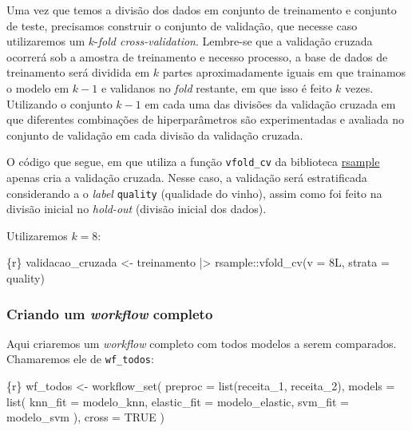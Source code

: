 \documentclass[
  letterpaper,
  DIV=11,
  numbers=noendperiod,
  oneside]{scrartcl}
\newenvironment{Shaded}{\begin{snugshade}}{\end{snugshade}}
\newcommand{\AttributeTok}[1]{\textcolor[rgb]{0.40,0.45,0.13}{#1}}
\newcommand{\ConstantTok}[1]{\textcolor[rgb]{0.56,0.35,0.01}{#1}}
\newcommand{\FunctionTok}[1]{\textcolor[rgb]{0.28,0.35,0.67}{#1}}
\newcommand{\InformationTok}[1]{\textcolor[rgb]{0.37,0.37,0.37}{#1}}
\newcommand{\NormalTok}[1]{\textcolor[rgb]{0.00,0.23,0.31}{#1}}
\newcommand{\OtherTok}[1]{\textcolor[rgb]{0.00,0.23,0.31}{#1}}
\newcommand{\SpecialCharTok}[1]{\textcolor[rgb]{0.37,0.37,0.37}{#1}}
\begin{document}
Uma vez que temos a divisão dos dados em conjunto de treinamento e
conjunto de teste, precisamos construir o conjunto de validação, que
necesse caso utilizaremos um \(k\)-\emph{fold cross-validation}.
Lembre-se que a validação cruzada ocorrerá sob a amostra de treinamento
e necesso processo, a base de dados de treinamento será dividida em
\(k\) partes aproximadamente iguais em que trainamos o modelo em \(k-1\)
e validanos no \emph{fold} restante, em que isso é feito \(k\) vezes.
Utilizando o conjunto \(k-1\) em cada uma das divisões da validação
cruzada em que diferentes combinações de hiperparâmetros são
experimentadas e avaliada no conjunto de validação em cada divisão da
validação cruzada.

O código que segue, em que utiliza a função \texttt{vfold\_cv} da
biblioteca \href{https://rsample.tidymodels.org/}{rsample} apenas cria a
validação cruzada. Nesse caso, a validação será estratificada
considerando a o \emph{label} \texttt{quality} (qualidade do vinho),
assim como foi feito na divisão inicial no \emph{hold-out} (divisão
inicial dos dados).

Utilizaremos \(k=8\):

\begin{Shaded}
\begin{Highlighting}[]
\InformationTok{\textasciigrave{}\textasciigrave{}\textasciigrave{}\{r\}}
\NormalTok{validacao\_cruzada }\OtherTok{\textless{}{-}} 
\NormalTok{  treinamento }\SpecialCharTok{|\textgreater{}} 
\NormalTok{  rsample}\SpecialCharTok{::}\FunctionTok{vfold\_cv}\NormalTok{(}\AttributeTok{v =}\NormalTok{ 8L, }\AttributeTok{strata =}\NormalTok{ quality)}
\InformationTok{\textasciigrave{}\textasciigrave{}\textasciigrave{}}
\end{Highlighting}
\end{Shaded}

\hypertarget{criando-um-workflow-completo}{%
\subsubsection{\texorpdfstring{Criando um \emph{workflow}
completo}{Criando um workflow completo}}\label{criando-um-workflow-completo}}

Aqui criaremos um \emph{workflow} completo com todos modelos a serem
comparados. Chamaremos ele de \texttt{wf\_todos}:

\begin{Shaded}
\begin{Highlighting}[]
\InformationTok{\textasciigrave{}\textasciigrave{}\textasciigrave{}\{r\}}
\NormalTok{wf\_todos }\OtherTok{\textless{}{-}}
  \FunctionTok{workflow\_set}\NormalTok{(}
    \AttributeTok{preproc =} \FunctionTok{list}\NormalTok{(receita\_1, receita\_2),}
    \AttributeTok{models =} \FunctionTok{list}\NormalTok{(}
      \AttributeTok{knn\_fit =}\NormalTok{ modelo\_knn,}
      \AttributeTok{elastic\_fit =}\NormalTok{ modelo\_elastic,}
      \AttributeTok{svm\_fit =}\NormalTok{ modelo\_svm}
\NormalTok{    ),}
    \AttributeTok{cross =} \ConstantTok{TRUE}
\NormalTok{  )}
\InformationTok{\textasciigrave{}\textasciigrave{}\textasciigrave{}}
\end{Highlighting}
\end{Shaded}
\end{document}
